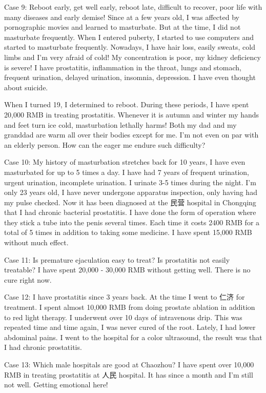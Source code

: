 \documentclass[
]{book}
\begin{document}
Case 9: Reboot early, get well early, reboot late, difficult to recover, poor life with many diseases and early demise! Since at a few years old, I was affected by pornographic movies and learned to masturbate. But at the time, I did not masturbate frequently. When I entered puberty, I started to use computers and started to masturbate frequently. Nowadays, I have hair loss, easily sweats, cold limbs and I'm very afraid of cold! My concentration is poor, my kidney deficiency is severe! I have prostatitis, inflammation in the throat, lungs and stomach, frequent urination, delayed urination, insomnia, depression. I have even thought about suicide.

When I turned 19, I determined to reboot. During these periods, I have spent 20,000 RMB in treating prostatitis. Whenever it is autumn and winter my hands and feet turn ice cold, masturbation lethally harms! Both my dad and my granddad are warm all over their bodies except for me. I'm not even on par with an elderly person. How can the eager me endure such difficulty?

Case 10: My history of masturbation stretches back for 10 years, I have even masturbated for up to 5 times a day. I have had 7 years of frequent urination, urgent urination, incomplete urination. I urinate 3-5 times during the night. I'm only 23 years old, I have never undergone apparatus inspection, only having had my pulse checked. Now it has been diagnosed at the 民营 hospital in Chongqing that I had chronic bacterial prostatitis. I have done the form of operation where they stick a tube into the penis several times. Each time it costs 2400 RMB for a total of 5 times in addition to taking some medicine. I have spent 15,000 RMB without much effect.

Case 11: Is premature ejaculation easy to treat? Is prostatitis not easily treatable? I have spent 20,000 - 30,000 RMB without getting well. There is no cure right now.

Case 12: I have prostatitis since 3 years back. At the time I went to 仁济 for treatment. I spent almost 10,000 RMB from doing prostate ablation in addition to red light therapy. I underwent over 10 days of intravenous drip. This was repeated time and time again, I was never cured of the root. Lately, I had lower abdominal pains. I went to the hospital for a color ultrasound, the result was that I had chronic prostatitis.

Case 13: Which male hospitals are good at Chaozhou? I have spent over 10,000 RMB in treating prostatitis at 人民 hospital. It has since a month and I'm still not well. Getting emotional here!
\end{document}
